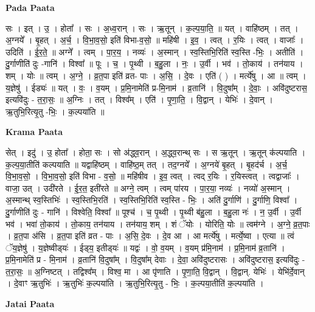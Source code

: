 \documentclass[17pt]{extarticle}
\begin{document}
\textbf{Pada Paata} \newline

सः । इत् । उ॒ । होता᳚ । सः । अ॒ध्व॒रान् । सः । ऋ॒तून् । क॒ल्प॒या॒ति॒ ॥ यत् । वाहि॑ष्ठम् । तत् । अ॒ग्नये᳚ । बृ॒हत् । अ॒र्च॒ । वि॒भा॒व॒सो॒ इति॑ विभा-व॒सो॒ ॥ महि॑षी । इ॒व॒ । त्वत् । र॒यिः । त्वत् । वाजाः᳚ । उदिति॑ । ई॒र॒ते॒ ॥ अग्ने᳚ । त्वम् । पा॒र॒य॒ । नव्यः॑ । अ॒स्मान् । स्व॒स्तिभि॒रिति॑ स्व॒स्ति -भिः॒ । अतीति॑ । दु॒र्गाणीति॑ दुः -गानि॑ । विश्वा᳚ ॥ पूः । च॒ । पृ॒थ्वी । ब॒हु॒ला । नः॒ । उ॒र्वी । भव॑ । तो॒काय॑ । तन॑याय । शम् । योः ॥ त्वम् । अ॒ग्ने॒ । व्र॒त॒पा इति॑ व्रत- पाः । अ॒सि॒ । दे॒वः । एति॑ ( ) । मर्त्ये॑षु । आ ॥ त्वम् । य॒ज्ञेषु॑ । ईड्यः॑ ॥ यत् । वः॒ । व॒यम् । प्र॒मि॒नामेति॑ प्र-मि॒नाम॑ । व्र॒तानि॑ । वि॒दुषा᳚म् । दे॒वाः॒ । अवि॑दुष्टरास॒ इत्यवि॑दुः - त॒रा॒सः॒ ॥ अ॒ग्निः । तत् । विश्व᳚म् । एति॑ । पृ॒णा॒ति॒ । वि॒द्वान् । येभिः॑ । दे॒वान् । ऋ॒तुभि॒रित्यृ॒तु -भिः॒ । क॒ल्पया॑ति ॥  \newline


\textbf{Krama Paata} \newline

सेत् । इदु॑ । उ॒ होता᳚ । होता॒ सः । सो अ॑द्ध्व॒रान् । अ॒द्ध्व॒रान्थ् सः । स ऋ॒तून् । ऋ॒तून् क॑ल्पयाति । क॒ल्प॒या॒तीति॑ कल्पयाति ॥ यद्वाहि॑ष्ठम् । वाहि॑ष्ठ॒म् तत् । तद॒ग्नये᳚ । अ॒ग्नये॑ बृ॒हत् । बृ॒हद॑र्च । अ॒र्च॒ वि॒भा॒व॒सो॒ । वि॒भा॒व॒सो॒ इति॑ विभा - व॒सो॒ ॥ महि॑षीव । इ॒व॒ त्वत् । त्वद् र॒यिः । र॒यिस्त्वत् । त्वद्वाजाः᳚ । वाजा॒ उत् । उदी॑रते । ई॒र॒त॒ इती॑रते ॥ अग्ने॒ त्वम् । त्वम् पा॑रय । पा॒र॒या॒ नव्यः॑ । नव्यो॑ अ॒स्मान् । अ॒स्मान्थ् स्व॒स्तिभिः॑ । स्व॒स्तिभि॒रति॑ । स्व॒स्तिभि॒रिति॑ स्व॒स्ति - भिः॒ । अति॑ दु॒र्गाणि॑ । दु॒र्गाणि॒ विश्वा᳚ । दु॒र्गाणीति॑ दुः - गानि॑ । विश्वेति॒ विश्वा᳚ ॥ पूश्च॑ । च॒ पृ॒थ्वी । पृ॒थ्वी ब॑हु॒ला । ब॒हु॒ला नः॑ । न॒ उ॒र्वी । उ॒र्वी भव॑ । भवा॑ तो॒काय॑ । तो॒काय॒ तन॑याय । तन॑याय॒ शम् । शं ॅयोः । योरिति॒ योः ॥ त्वम॑ग्ने । अ॒ग्ने॒ व्र॒त॒पाः । व्र॒त॒पा अ॑सि । व्र॒त॒पा इति॑ व्रत - पाः । अ॒सि॒ दे॒वः । दे॒व आ । आ मर्त्ये॑षु । मर्त्ये॒ष्वा । एत्या ॥ त्वं ॅय॒ज्ञेषु॑ । य॒ज्ञेष्वीड्‍यः॑ । ईड्‍य॒ इतीड्‍यः॑ ॥ यद्वः॑ । वो॒ व॒यम् । व॒यम् प्र॑मि॒नाम॑ । प्र॒मि॒नाम॑ व्र॒तानि॑ । प्र॒मि॒नामेति॑ प्र - मि॒नाम॑ । व्र॒तानि॑ वि॒दुषा᳚म् । वि॒दुषा᳚म् देवाः । दे॒वा॒ अवि॑दुष्टरासः । अवि॑दुष्टरास॒ इत्यवि॑दुः - त॒रा॒सः॒ ॥ अ॒ग्निष्टत् । तद्विश्व᳚म् । विश्व॒ मा । आ पृ॑णाति । पृ॒णा॒ति॒ वि॒द्वान् । वि॒द्वान्. येभिः॑ । येभि॑र्दे॒वान् । दे॒वाꣳ ऋ॒तुभिः॑ । ऋ॒तुभिः॑ क॒ल्पया॑ति । ऋ॒तुभि॒रित्यृ॒तु - भिः॒ । क॒ल्पया॒तीति॑ क॒ल्पया॑ति । \newline

\textbf{Jatai Paata} \newline
\end{document}
